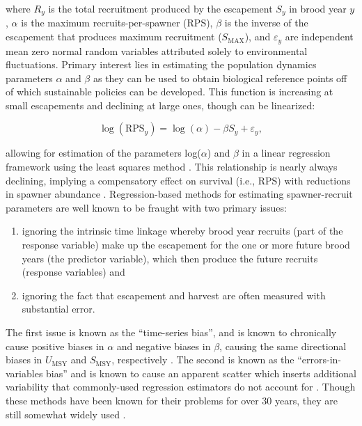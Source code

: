 \documentclass[12pt,]{book}
\theoremstyle{definition}
\theoremstyle{definition}
\theoremstyle{definition}
\theoremstyle{remark}
\begin{document}
\noindent
where \(R_y\) is the total recruitment produced by the escapement
\(S_y\) in brood year \(y\), \(\alpha\) is the maximum
recruits-per-spawner (RPS), \(\beta\) is the inverse of the escapement
that produces maximum recruitment (\(S_{\text{MAX}}\)), and
\(\varepsilon_y\) are independent mean zero normal random variables
attributed solely to environmental fluctuations. Primary interest lies
in estimating the population dynamics parameters \(\alpha\) and
\(\beta\) as they can be used to obtain biological reference points off
of which sustainable policies can be developed. This function is
increasing at small escapements and declining at large ones, though can
be linearized:

\begin{equation}
  \log(\text{RPS}_y)=\log(\alpha)-\beta S_y + \varepsilon_y,
  \label{eq:lin-ricker-fixed}
\end{equation}

\noindent
allowing for estimation of the parameters log(\(\alpha\)) and \(\beta\)
in a linear regression framework using the least squares method
\citep{clark-etal-2009}. This relationship is nearly always declining,
implying a compensatory effect on survival (i.e., RPS) with reductions
in spawner abundance \citep{rose-etal-2001}. Regression-based methods
for estimating spawner-recruit parameters are well known to be fraught
with two primary issues:

\begin{enumerate}
\def\labelenumi{(\arabic{enumi})}
\item
  ignoring the intrinsic time linkage whereby brood year recruits (part
  of the response variable) make up the escapement for the one or more
  future brood years (the predictor variable), which then produce the
  future recruits (response variables) and
\item
  ignoring the fact that escapement and harvest are often measured with
  substantial error.
\end{enumerate}

\noindent
The first issue is known as the ``time-series bias'', and is known to
chronically cause positive biases in \(\alpha\) and negative biases in
\(\beta\), causing the same directional biases in \(U_{\text{MSY}}\) and
\(S_{\text{MSY}}\), respectively \citep[i.e., spuriously providing too
aggressive harvest policy recommendations;][]{walters-1985}. The second
is known as the ``errors-in-variables bias'' and is known to cause an
apparent scatter which inserts additional variability that commonly-used
regression estimators do not account for \citep{ludwig-walters-1981}.
Though these methods have been known for their problems for over 30
years, they are still somewhat widely used \citep{korman-english-2013}.
\end{document}
